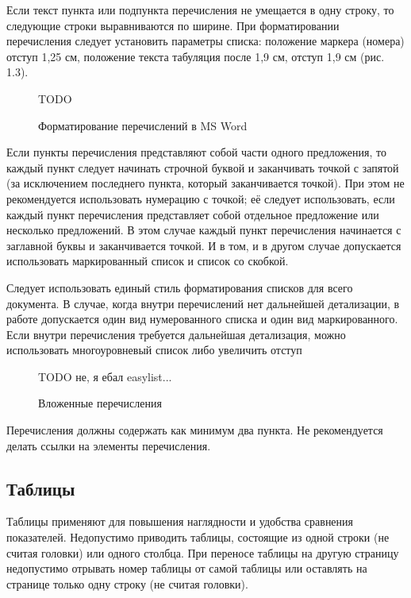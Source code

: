 Если текст пункта или подпункта перечисления не умещается в одну строку, то
следующие строки выравниваются по ширине. При форматировании перечисления следует
установить параметры списка: положение маркера (номера) отступ 1,25 см, положение текста
табуляция после 1,9 см, отступ 1,9 см (рис. 1.3).

\begin{figure}[h]
	\begin{mdframed}
		\centerline{TODO}
	\end{mdframed}
	\caption{Форматирование перечислений в MS Word}
	\label{subsects}
\end{figure}

Если пункты перечисления представляют собой части одного предложения, то каждый
пункт следует начинать строчной буквой и заканчивать точкой с запятой (за исключением
последнего пункта, который заканчивается точкой). При этом не рекомендуется использовать
нумерацию с точкой; её следует использовать, если каждый пункт перечисления представляет
собой отдельное предложение или несколько предложений. В этом случае каждый пункт
перечисления начинается с заглавной буквы и заканчивается точкой. И в том, и в другом случае
допускается использовать маркированный список и список со скобкой.

Следует использовать единый стиль форматирования списков для всего документа. В
случае, когда внутри перечислений нет дальнейшей детализации, в работе допускается один вид
нумерованного списка и один вид маркированного. Если внутри перечисления требуется
дальнейшая детализация, можно использовать многоуровневый список либо увеличить отступ

\begin{figure}[h]
	\begin{mdframed}
		\centerline{TODO не, я ебал easylist...}
	\end{mdframed}
	\caption{Вложенные перечисления}
	\label{subsects}
\end{figure}

Перечисления должны содержать как минимум два пункта. Не рекомендуется делать
ссылки на элементы перечисления.

\subsection{Таблицы}
Таблицы применяют для повышения наглядности и удобства сравнения показателей.
Недопустимо приводить таблицы, состоящие из одной строки (не считая головки) или
одного столбца. При переносе таблицы на другую страницу недопустимо отрывать номер
таблицы от самой таблицы или оставлять на странице только одну строку (не считая головки).

